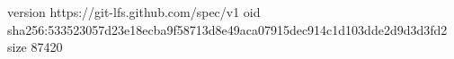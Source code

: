 version https://git-lfs.github.com/spec/v1
oid sha256:533523057d23e18ecba9f58713d8e49aca07915dec914c1d103dde2d9d3d3fd2
size 87420
